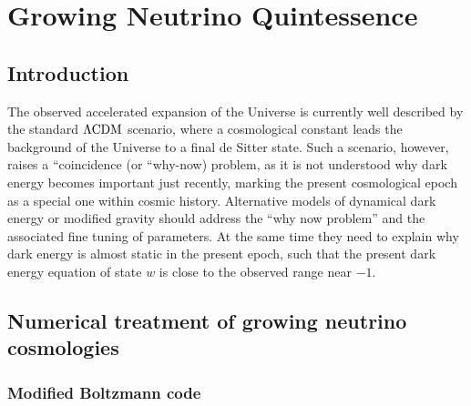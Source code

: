 \chapter{Growing Neutrino Quintessence}



\section{Introduction}



The observed accelerated expansion of the Universe is currently well
described by the standard $\Lambda\mathrm{CDM}$ scenario, where a cosmological
constant leads the background of the Universe to a final de Sitter
state. Such a scenario, however, raises a ``coincidence\textquotedbl{}
(or ``why-now\textquotedbl{}) problem, as it is not understood why
dark energy becomes important just recently, marking the present cosmological
epoch as a special one within cosmic history. Alternative models of
dynamical dark energy or modified gravity should address the ``why
now problem'' and the associated fine tuning of parameters. At the
same time they need to explain why dark energy is almost static in
the present epoch, such that the present dark energy equation of state
$w$ is close to the observed range near $-1$.



\section{Numerical treatment of growing neutrino cosmologies}


\subsection{Modified Boltzmann code\label{sub:Modified-Boltzmann-code}}

